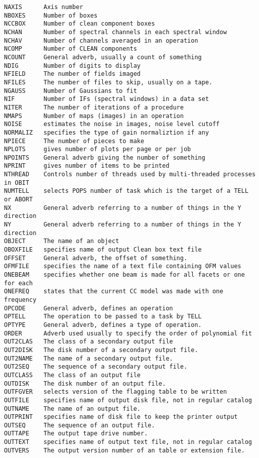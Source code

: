 \begin{verbatim}
NAXIS      Axis number
NBOXES     Number of boxes
NCCBOX     Number of clean component boxes
NCHAN      Number of spectral channels in each spectral window
NCHAV      Number of channels averaged in an operation
NCOMP      Number of CLEAN components
NCOUNT     General adverb, usually a count of something
NDIG       Number of digits to display
NFIELD     The number of fields imaged
NFILES     The number of files to skip, usually on a tape.
NGAUSS     Number of Gaussians to fit
NIF        Number of IFs (spectral windows) in a data set
NITER      The number of iterations of a procedure
NMAPS      Number of maps (images) in an operation
NOISE      estimates the noise in images, noise level cutoff
NORMALIZ   specifies the type of gain normaliztion if any
NPIECE     The number of pieces to make
NPLOTS     gives number of plots per page or per job
NPOINTS    General adverb giving the number of something
NPRINT     gives number of items to be printed
NTHREAD    Controls number of threads used by multi-threaded processes in OBIT
NUMTELL    selects POPS number of task which is the target of a TELL or ABORT
NX         General adverb referring to a number of things in the Y direction
NY         General adverb referring to a number of things in the Y direction
OBJECT     The name of an object
OBOXFILE   specifies name of output Clean box text file
OFFSET     General adverb, the offset of something.
OFMFILE    specifies the name of a text file containing OFM values
ONEBEAM    specifies whether one beam is made for all facets or one for each
ONEFREQ    states that the current CC model was made with one frequency
OPCODE     General adverb, defines an operation
OPTELL     The operation to be passed to a task by TELL
OPTYPE     General adverb, defines a type of operation.
ORDER      Adverb used usually to specify the order of polynomial fit
OUT2CLAS   The class of a secondary output file
OUT2DISK   The disk number of a secondary output file.
OUT2NAME   The name of a secondary output file.
OUT2SEQ    The sequence of a secondary output file.
OUTCLASS   The class of an output file
OUTDISK    The disk number of an output file.
OUTFGVER   selects version of the flagging table to be written
OUTFILE    specifies name of output disk file, not in regular catalog
OUTNAME    The name of an output file.
OUTPRINT   specifies name of disk file to keep the printer output
OUTSEQ     The sequence of an output file.
OUTTAPE    The output tape drive number.
OUTTEXT    specifies name of output text file, not in regular catalog
OUTVERS    The output version number of an table or extension file.

\end{verbatim}
